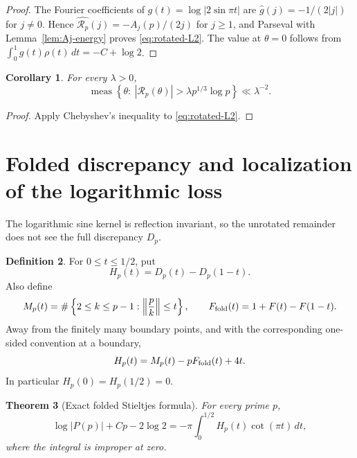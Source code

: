 \documentclass[11pt]{amsart}
\numberwithin{equation}{section}
\newtheorem{theorem}{Theorem}[section]
\newtheorem{corollary}[theorem]{Corollary}
\theoremstyle{definition}
\newtheorem{definition}[theorem]{Definition}
\theoremstyle{remark}
\begin{document}
\begin{proof}
The Fourier coefficients of
\(g(t)=\log|2\sin\pi t|\) are
\(\widehat g(j)=-1/(2|j|)\) for \(j\ne0\).  Hence
\(\widehat{\mathscr R_p}(j)=-A_j(p)/(2j)\) for \(j\ge1\), and Parseval
with Lemma~\ref{lem:Aj-energy} proves \eqref{eq:rotated-L2}.  The value at
\(\theta=0\) follows from
\(\int_0^1g(t)\rho(t)\,dt=-C+\log2\).
\end{proof}

\begin{corollary}\label{cor:rotated-Chebyshev}
For every \(\lambda>0\),
\begin{equation}\label{eq:rotated-exceptional}
 \operatorname{meas}\left\{\theta:\ |\mathscr R_p(\theta)|>
 \lambda p^{1/3}\log p\right\}\ll\lambda^{-2}.
\end{equation}
\end{corollary}

\begin{proof}
Apply Chebyshev's inequality to \eqref{eq:rotated-L2}.
\end{proof}

\section{Folded discrepancy and localization of the logarithmic loss}
\label{sec:folded-discrepancy}

The logarithmic sine kernel is reflection invariant, so the unrotated
remainder does not see the full discrepancy \(D_p\).

\begin{definition}\label{def:Hp}
For \(0\le t\le1/2\), put
\begin{equation}\label{eq:Hp-def}
 H_p(t)=D_p(t)-D_p(1-t).
\end{equation}
Also define
\begin{equation}\label{eq:Mp-Ffold}
 M_p(t)=\#\left\{2\le k\le p-1:\left\|\frac pk\right\|\le t\right\},
 \qquad F_{\rm fold}(t)=1+F(t)-F(1-t).
\end{equation}
Away from the finitely many boundary points, and with the corresponding
one-sided convention at a boundary,
\begin{equation}\label{eq:Hp-Mp}
 H_p(t)=M_p(t)-pF_{\rm fold}(t)+4t.
\end{equation}
In particular \(H_p(0)=H_p(1/2)=0\).
\end{definition}

\begin{theorem}[Exact folded Stieltjes formula]\label{thm:folded-Stieltjes}
For every prime \(p\),
\begin{equation}\label{eq:folded-Stieltjes}
 \log|P(p)|+Cp-2\log2
 =-\pi\int_0^{1/2}H_p(t)\cot(\pi t)\,dt,
\end{equation}
where the integral is improper at zero.
\end{theorem}
\end{document}
